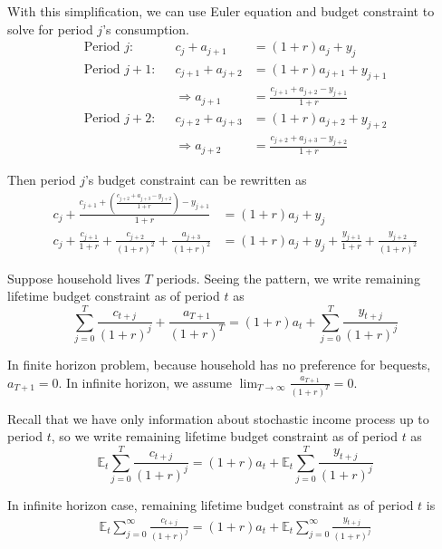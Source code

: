 \documentclass[11pt]{article}
\newcommand{\expectation}{\mathbb{E}}
\begin{document}
With this simplification, we can use Euler equation and budget constraint to solve for period $j$'s consumption.
\begin{align*}
    \text{Period $j$:} && c_j + a_{j+1} &= (1+r)a_j + y_j \\
    \text{Period $j+1$:} && c_{j+1} + a_{j+2} &= (1+r)a_{j+1} + y_{j+1} \\
    && \Rightarrow a_{j+1} &= \frac{c_{j+1} + a_{j+2} - y_{j+1}}{1+r} \\
    \text{Period $j+2$:} && c_{j+2} + a_{j+3} &= (1+r)a_{j+2} + y_{j+2} \\
    && \Rightarrow a_{j+2} &= \frac{c_{j+2} + a_{j+3} - y_{j+2}}{1+r}
\end{align*}

Then period $j$'s budget constraint can be rewritten as 
\begin{align*}
    c_j + \frac{c_{j+1} + \left(\frac{c_{j+2} + a_{j+3} - y_{j+2}}{1+r}\right) - y_{j+1}}{1+r} &= (1+r)a_j + y_j \\ 
    c_j + \frac{c_{j+1}}{1+r} + \frac{c_{j+2}}{(1+r)^2} + \frac{a_{j+3}}{(1+r)^2} &= (1+r)a_j + y_j + \frac{y_{j+1}}{1+r} + \frac{y_{j+2}}{(1+r)^2}
\end{align*}

Suppose household lives $T$ periods. Seeing the pattern, we write remaining lifetime budget constraint as of period $t$ as $$\sum_{j=0}^T \frac{c_{t+j}}{(1+r)^j} + \frac{a_{T+1}}{(1+r)^T} = (1+r)a_t + \sum_{j=0}^T \frac{y_{t+j}}{(1+r)^j}$$

In finite horizon problem, because household has no preference for bequests, $a_{T+1} = 0$. In infinite horizon, we assume $\lim_{T \to \infty} \frac{a_{T+1}}{(1+r)^T} = 0$.

Recall that we have only information about stochastic income process up to period $t$, so we write remaining lifetime budget constraint as of period $t$ as $$\expectation_t \sum_{j=0}^T \frac{c_{t+j}}{(1+r)^j} = (1+r)a_t + \expectation_t \sum_{j=0}^T \frac{y_{t+j}}{(1+r)^j}$$

In infinite horizon case, remaining lifetime budget constraint as of period $t$ is 
\begin{align*}
    \expectation_t \sum_{j=0}^\infty \frac{c_{t+j}}{(1+r)^j} = (1+r)a_t + \expectation_t \sum_{j=0}^\infty \frac{y_{t+j}}{(1+r)^j}
\end{align*}
\end{document}
